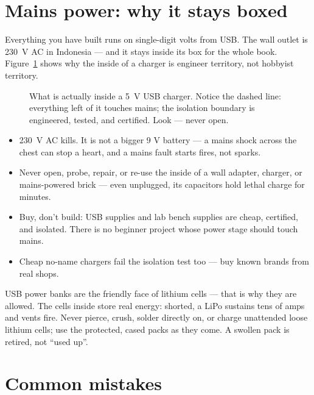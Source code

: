 \section{Mains power: why it stays boxed}
\label{sec:mains}

Everything you have built runs on single-digit volts from USB. The wall
outlet is \qty{230}{\volt} AC in Indonesia — and it stays inside its box
for the whole book. Figure~\ref{fig:wall} shows why the
inside of a charger is engineer territory, not hobbyist territory.

\begin{figure}[htbp]
\centering

\caption{What is actually inside a \qty{5}{\volt} USB charger. Notice the
dashed line: everything left of it touches mains; the isolation boundary
is engineered, tested, and certified. Look — never open.}
\label{fig:wall}
\end{figure}

\begin{rulebox}
\begin{itemize}
\item \qty{230}{\volt} AC kills. It is not a bigger 9 V battery — a
mains shock across the chest can stop a heart, and a mains fault starts
fires, not sparks.
\item Never open, probe, repair, or re-use the inside of a wall
adapter, charger, or mains-powered brick — even unplugged, its
capacitors hold lethal charge for minutes.
\item Buy, don't build: USB supplies and lab bench supplies are
cheap, certified, and isolated. There is no beginner project whose
power stage should touch mains.
\item Cheap no-name chargers fail the isolation test too — buy known
brands from real shops.
\end{itemize}
\end{rulebox}

\begin{rulebox}
USB power banks are the friendly face of lithium cells — that is why
they are allowed. The cells inside store real energy: shorted, a LiPo
sustains tens of amps and vents fire. Never pierce, crush, solder
directly on, or charge unattended loose lithium cells; use the
protected, cased packs as they come. A swollen pack is retired, not
``used up''.
\end{rulebox}

\section{Common mistakes}
\label{sec:mistakes07}

